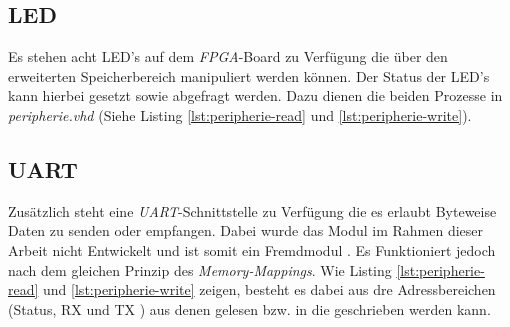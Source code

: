        


        
        

        \subsection{LED}
            Es stehen acht LED's auf dem \textit{FPGA}-Board zu Verfügung die über den erweiterten Speicherbereich
            manipuliert werden können. Der Status der LED's kann hierbei gesetzt sowie abgefragt werden.
            Dazu dienen die beiden Prozesse in \textit{peripherie.vhd} (Siehe Listing \ref{lst:peripherie-read} und \ref{lst:peripherie-write}).

        \subsection{UART}
            Zusätzlich steht eine \textit{UART}-Schnittstelle zu Verfügung die es erlaubt Byteweise Daten
            zu senden oder empfangen.
            Dabei wurde das Modul im Rahmen dieser Arbeit nicht Entwickelt und ist somit ein Fremdmodul \cite{vhdl-uart}.
            Es Funktioniert jedoch nach dem gleichen Prinzip des \textit{Memory-Mappings}.
            Wie Listing \ref{lst:peripherie-read} und \ref{lst:peripherie-write} zeigen,
            besteht es dabei aus dre Adressbereichen (Status, RX und TX ) aus denen gelesen bzw. in die geschrieben werden kann.
            


